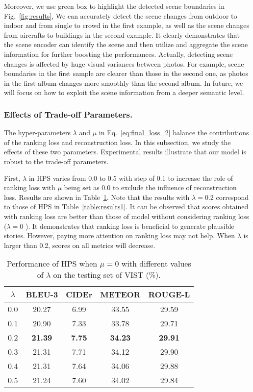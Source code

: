 \documentclass[letterpaper]{article} \usepackage{aaai19}  \usepackage{times}  \usepackage{helvet}  \usepackage{courier}  \usepackage{url}  \usepackage{graphicx}  \usepackage{color}
\begin{document}
Moreover, we use green box to highlight the detected scene boundaries in Fig.~\ref{fig:results}, We can accurately detect the scene changes from outdoor to indoor and from single to crowd in the first example, as well as the scene changes from aircrafts to buildings in the second example. It clearly demonstrates that the scene encoder can identify the scene and then utilize and aggregate the scene information for further boosting the performances.
Actually, detecting scene changes is affected by huge visual variances between photos. For example, scene boundaries in the first sample are clearer than those in the second one, as photos in the first album changes more smoothly than the second album. In future, we will focus on how to exploit the scene information from a deeper semantic level.


\subsubsection{Effects of Trade-off Parameters.}
The hyper-parameters $\lambda$ and $\mu$ in Eq.~\eqref{eq:final_loss_2} balance the contributions of the  ranking loss and reconstruction loss. In this subsection, we study the effects of these two parameters. Experimental results illustrate that our model is robust to the trade-off parameters.


First,  $\lambda$ in HPS varies from 0.0 to 0.5 with step of 0.1 to increase the role of ranking loss with $\mu$ being set as 0.0 to exclude the influence of reconstruction loss.
Results are shown in Table~\ref{table:results_lambda}. Note that the results with $\lambda=0.2$  correspond to those of HPS in Table~\ref{table:results1}. It can be observed that scores obtained with ranking loss are better than those of model without considering ranking loss ($\lambda=0$ ). It demonstrates that ranking loss is beneficial to generate plausible stories. However, paying more attention on ranking loss may not help. When $\lambda$ is larger than 0.2, scores on all metrics will decrease.

\begin{table}[h]
\begin{center}
\caption{Performance of HPS when $\mu=0$ with different values of $\lambda$ on the testing set of VIST (\%). }
\begin{adjustbox}{width=0.345\textwidth} \label{table:results_lambda}
\begin{tabular}{c|c|c|c|c}
\hline
$\lambda$    & BLEU-3 & CIDEr & METEOR  & ROUGE-L \\ \hline
0.0   &20.27 &6.99  & 33.55 & 29.59 \\
0.1  &20.90 &7.33 &33.78 &29.71 \\
0.2   &\textbf{21.39} &\textbf{7.75}  &\textbf{34.23}  &\textbf{29.91}  \\
0.3  &21.31 &7.71 &34.12 &29.90 \\
0.4   &21.31 &7.64 &34.06  &29.88  \\
0.5  &21.24 &7.60 &34.02 &29.84 \\
\hline
\end{tabular}
\end{adjustbox}
\end{center}
\end{table}
\end{document}
